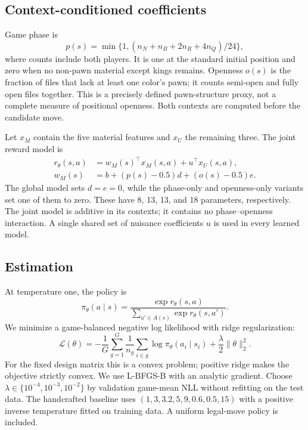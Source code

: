 \documentclass[11pt]{article}
\begin{document}
\subsection{Context-conditioned coefficients}
Game phase is
\[
p(s)=\min\{1,(n_N+n_B+2n_R+4n_Q)/24\},
\]
where counts include both players. It is one at the standard initial position and zero when no non-pawn material except kings remains. Openness $o(s)$ is the fraction of files that lack at least one color's pawn; it counts semi-open and fully open files together. This is a precisely defined pawn-structure proxy, not a complete measure of positional openness. Both contexts are computed before the candidate move.

Let $x_M$ contain the five material features and $x_U$ the remaining three. The joint reward model is
\begin{align}
r_\theta(s,a)&=w_M(s)^\top x_M(s,a)+u^\top x_U(s,a),\\
w_M(s)&=b+(p(s)-0.5)d+(o(s)-0.5)e.
\end{align}
The global model sets $d=e=0$, while the phase-only and openness-only variants set one of them to zero. These have 8, 13, 13, and 18 parameters, respectively. The joint model is additive in its contexts; it contains no phase--openness interaction. A single shared set of nuisance coefficients $u$ is used in every learned model.

\subsection{Estimation}
At temperature one, the policy is
\[
\pi_\theta(a\mid s)=\frac{\exp r_\theta(s,a)}{\sum_{a'\in A(s)}\exp r_\theta(s,a')}.
\]
We minimize a game-balanced negative log likelihood with ridge regularization:
\[
\mathcal L(\theta)=-\frac1G\sum_{g=1}^G\frac1{n_g}
\sum_{i\in g}\log\pi_\theta(a_i\mid s_i)+\frac\lambda2\|\theta\|_2^2.
\]
For the fixed design matrix this is a convex problem; positive ridge makes the objective strictly convex. We use L-BFGS-B with an analytic gradient. Choose $\lambda\in\{10^{-4},10^{-3},10^{-2}\}$ by validation game-mean NLL without refitting on the test data. The handcrafted baseline uses $(1,3,3.2,5,9,0.6,0.5,15)$ with a positive inverse temperature fitted on training data. A uniform legal-move policy is included.
\end{document}
